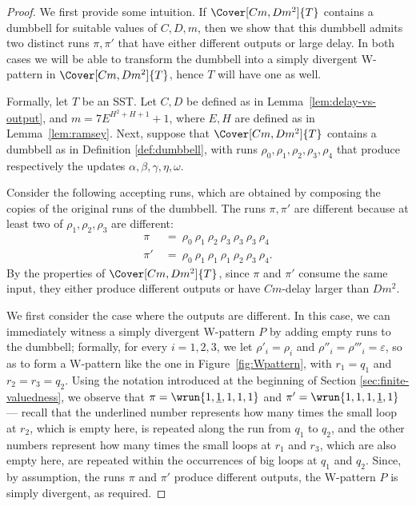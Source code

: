 \documentclass{article}
\begin{document}
\begin{proof}
We first provide some intuition. 
If $\Cover[Cm,Dm^2]{T}$ contains a dumbbell for suitable values of $C,D,m$, then we show that
this dumbbell admits two distinct runs $\pi,\pi'$
that have either different outputs or  large delay. 
In both cases we will be able to transform the dumbbell 
into a simply divergent W-pattern in $\Cover[Cm,Dm^2]{T}$, hence $T$ will have one as well.


Formally, let $T$ be an SST. Let $C,D$ be defined 
as in Lemma~\ref{lem:delay-vs-output}, and
$m = 7E^{H^2 + H + 1} + 1$, where $E,H$ are 
defined as in Lemma~\ref{lem:ramsey}.
Next, suppose that $\Cover[Cm,Dm^2]{T}$ contains
a dumbbell as in Definition \ref{def:dumbbell}, 
with runs $\rho_0,\rho_1,\rho_2,\rho_3,\rho_4$
that produce respectively the updates
$\alpha,\beta,\gamma,\eta,\omega$. 

Consider the following accepting runs, which are obtained
by composing the copies of the original runs of the dumbbell. The runs $\pi, \pi'$ are different because at least two of $\rho_1,\rho_2,\rho_3$ are different:
\begin{equation}\label{eq:cover-runs}
\begin{aligned}
	\pi  &~=~  \rho_0 ~ \rho_1 ~ \rho_2 ~ \rho_3 ~ \rho_3 ~ \rho_3 ~ \rho_4\\
    \pi' &~=~ \rho_0 ~ \rho_1 ~ \rho_1 ~ \rho_1 ~ \rho_2 ~ \rho_3 ~ \rho_4.
\end{aligned}
\end{equation}
By the properties of $\Cover[Cm,Dm^2]{T}$, 
since $\pi$ and $\pi'$ consume the same input,
they either produce different outputs or
have $Cm$-delay larger than $Dm^2$.

We first consider the case where the outputs are 
different. In this case, we can immediately
witness a simply divergent W-pattern $P$
by adding empty runs to the dumbbell;
formally, for every $i=1,2,3$, we let 
$\rho'_i = \rho_i$ and $\rho''_i = \rho'''_i = \varepsilon$,
so as to form a W-pattern like the one in Figure~\ref{fig:Wpattern}, with
$r_1 = q_1$ and $r_2 = r_3 = q_2$.
Using the notation introduced at the beginning 
of Section \ref{sec:finite-valuedness}, we observe that 
$\pi  = \wrun{1,\underline{1},1,1,1}$ and 
$\pi' = \wrun{1,1,1,\underline{1},1}$
---
recall that the underlined number represents
how many times the small loop at $r_2$,
which is empty here, is repeated along the
run from $q_1$ to $q_2$, and the
other numbers represent how many times the small
loops at $r_1$ and $r_3$, which are also empty here,
are repeated within the occurrences of big loops 
at $q_1$ and $q_2$.
Since, by assumption, the runs $\pi$ and $\pi'$ 
produce different outputs, the W-pattern $P$ 
is simply divergent, as required.


\end{proof}
\end{document}
